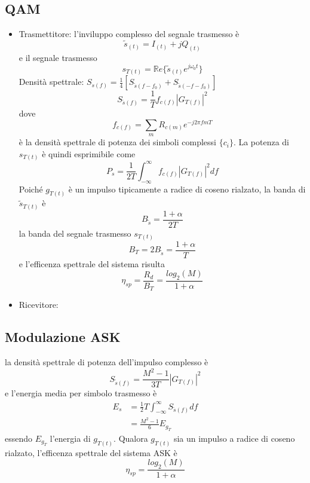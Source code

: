    \subsection{QAM}
        \begin{itemize}
            \item {Trasmettitore:
                l'inviluppo complesso del segnale trasmesso è 
                \[
                    \tilde{s}_{(t)} = I_{(t)} +j Q_{(t)}      
                \]
                e il segnale trasmesso
                \[
                    s_{T(t)} = \mathbb{R}e\{\tilde{s}_{(t)}e^{j\omega_0t}\}
                \]
                Densità spettrale: $S_{s(f)} = \frac{1}{4}\left[S_{\tilde{s}{(f-f_0)}}+ S_{\tilde{s}{(-f-f_0)}}\right]$
                \[
                    S_{\tilde{s}{(f)}} = \frac{1}{T} f_{c(f)}\left|G_{T(f)}\right|^2    
                \]
                dove 
                \[
                    f_{c(f)} = \sum_{m}R_{c(m)}e^{-j2\pi fmT}
                \]
                è la densità spettrale di potenza dei simboli complessi $\{c_i\}$. La potenza di $s_{T(t)}$ è quindi esprimibile come
                \[
                    P_s=\frac{1}{2T} \int_{-\infty}^{\infty} f_{c(f)} \left|G_{T(f)}\right|^2 df
                \]
                Poiché $g_{T(t)}$ è un impulso tipicamente a radice di coseno rialzato, la banda di $\tilde{s}_{T(t)}$ è 
                \[
                    B_{\tilde{s}}=\frac{1+\alpha}{2T}    
                \]
                la banda del segnale trasmesso $s_{T(t)}$ 
                \[
                    B_{T}=2B_{\tilde{s}} =\frac{1+\alpha}{T}
                \]
                e l'efficenza spettrale del sistema risulta 
                \[
                    \eta_{sp} = \frac{R_d}{B_T} = \frac{log_2(M)}{1+\alpha} 
                \]
            }
            \item {Ricevitore:

            }
        \end{itemize}
            
    \subsection{Modulazione ASK}
        la densità spettrale di potenza dell'impulso complesso è 
        \[
            S_{\tilde{s}(f)} = \frac{M^2-1}{3T}\left|G_{T(f)}\right|^2
        \]
        e l'energia media per simbolo trasmesso è 
        \begin{align}
            E_s &= \frac{1}{2}T\int_{-\infty}^{\infty}S_{\tilde{s}(f)}df\nonumber \\
                &= \frac{M^2-1}{6}E_{g_T}\nonumber
        \end{align}
        essendo $E_{g_T}$ l'energia di $g_{T(t)}$. Qualora $g_{T(t)}$ sia un impulso a radice di coseno rialzato, l'efficenza spettrale
        del sistema ASK è 
        \[
            \eta_{sp} = \frac{log_2(M)}{1+\alpha}    
        \]

